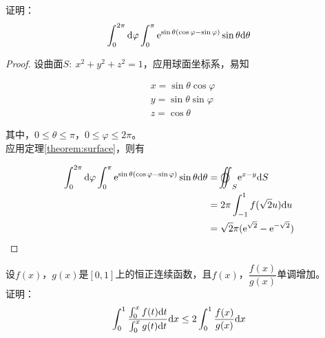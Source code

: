 \begin{proposition}

    证明：$$\int_{0}^{2\pi}\mathrm{d} \varphi \int_{0}^{\pi}{\mathrm{e}^{\sin{\theta}(\cos{\varphi} - \sin{\varphi})}\sin{\theta}}\mathrm{d} \theta$$

\end{proposition}

\begin{proof}

    设曲面$S:\ x^2 + y^2 + z^2 = 1$，应用球面坐标系，易知

    \begin{align*}
        &x = \sin{\theta} \cos{\varphi} \\
        &y = \sin{\theta} \sin{\varphi} \\
        &z = \cos{\theta}         
    \end{align*}

    其中，$0 \leq \theta \leq \pi$，$0 \leq \varphi \leq 2\pi$。\\
    应用定理\ref{theorem:surface}，则有

    \begin{align*}
        \int_{0}^{2\pi}\diff \varphi \int_{0}^{\pi}{\euler^{\sin{\theta}(\cos{\varphi} - \sin{\varphi})}\sin{\theta}}\diff \theta & =\ooint_{S}{\euler^{x - y}}\diff S \\
        & = 2\pi \int_{-1}^{1}{f(\sqrt{2}u)}\diff u \\
        & = \sqrt{2}\pi(\euler^{\sqrt{2}} - \euler^{-\sqrt{2}})
    \end{align*}

\end{proof}

\begin{proposition}

    设$f(x)$，$g(x)$是$[0,1]$上的恒正连续函数，且$f(x)$，$\dfrac{f(x)}{g(x)}$单调增加。\\
    证明：
    $$\int_{0}^{1}{\dfrac{\int_{0}^{x}{f(t)}\mathrm{d} t}{\int_{0}^{x}{g(t)}\mathrm{d} t}}\mathrm{d} x \leq 2\int_{0}^{1}{\dfrac{f(x)}{g(x)}}\mathrm{d} x$$

\end{proposition}

